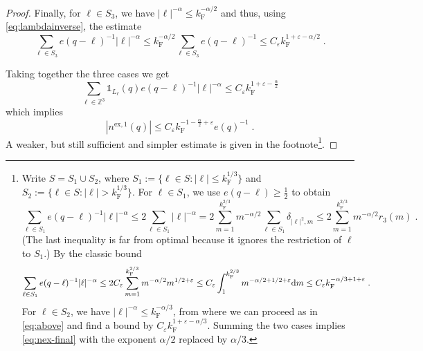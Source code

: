 \documentclass[12pt,a4paper]{article}
\numberwithin{equation}{section}
\newcommand{\1}{\mathbb{I}}
\newcommand{\di}{\textnormal{d}}
\newcommand{\ex}{\mathrm{ex}}
\newcommand{\F}{\mathrm{F}}
\newcommand{\kF}{k_\F}
\newcommand{\Zstar}{\mathbb{Z}^3} %
\newcommand{\Z}{\mathbb{Z}}
\theoremstyle{plain}
\theoremstyle{definition}
\theoremstyle{remark}
\theoremstyle{plain}
\theoremstyle{definition}
\theoremstyle{remark}
\begin{document}
\begin{proof}
\medskip

Finally, for $ \ell \in S_3 $, we have $ |\ell|^{-\alpha} \le \kF^{-\alpha/2} $ and thus, using \eqref{eq:lambdainverse}, the estimate
\begin{equation}\label{eq:above}
	\sum_{\ell \in S_3} e(q-\ell)^{-1} |\ell|^{-\alpha}
	\le \kF^{-\alpha/2} \sum_{\ell \in S_3} e(q-\ell)^{-1}
	\le C_\varepsilon \kF^{1 + \varepsilon - \alpha/2} \;.
\end{equation}

Taking together the three cases we get
\begin{equation}
	\sum_{\ell \in \Zstar} \mathds{1}_{L_\ell}(q) e(q-\ell)^{-1} |\ell|^{-\alpha}
	\le C_\varepsilon \kF^{1 + \varepsilon - \frac{\alpha}{2}}
\end{equation}
	which implies
\begin{equation}	\label{eq:nex-final}
	|n^{\ex,1}(q)|
	\leq C_\varepsilon \kF^{-1 - \frac{\alpha}{2} + \varepsilon} e(q)^{-1} \;.
\end{equation}
A weaker, but still sufficient and simpler estimate is given in the footnote\footnote{
Write  $ S = S_1 \cup S_2$, where $S_1  := \{ \ell \in S : |\ell| \le \kF^{1/3} \} $ and $S_2  := \{ \ell \in S : |\ell| > \kF^{1/3} \} $. For $ \ell \in S_1 $, we use $ e(q-\ell) \ge \frac{1}{2} $ to obtain
\begin{equation}
	\sum_{\ell \in S_1} e(q-\ell)^{-1} |\ell|^{-\alpha} \leq 2 \sum_{\ell \in S_1}  |\ell|^{-\alpha}
	= 2 \sum_{m = 1}^{\kF^{2/3}}  m^{-\alpha/2} \sum_{\ell \in S_1} \delta_{|\ell|^2, m}
	\leq 2 \sum_{m = 1}^{\kF^{2/3}}  m^{-\alpha/2} r_3(m) \;.
\end{equation}
(The last inequality is far from optimal because it ignores the restriction of $\ell$ to $S_1$.) By the classic bound
\begin{equation}
	\sum_{\ell \in S_1} e(q-\ell)^{-1} |\ell|^{-\alpha}
	\leq 2 C_\varepsilon \sum_{m = 1}^{\kF^{2/3}}  m^{-\alpha/2}  m^{1/2 + \varepsilon}
	\leq C_\varepsilon \int_1^{\kF^{2/3}} m^{-\alpha/2 + 1/2 + \varepsilon} \di m
	\leq C_\varepsilon \kF^{-\alpha/3 + 1 + \varepsilon} \;.
\end{equation}
%
For $ \ell \in S_2 $, we have $ |\ell|^{-\alpha} \le \kF^{-\alpha/3} $, from where we can proceed as in \eqref{eq:above} and find a bound by $ C_\varepsilon \kF^{1 + \varepsilon - \alpha/3}$. Summing the two cases implies \eqref{eq:nex-final} with the exponent $\alpha/2$ replaced by $\alpha/3$.
}.

\bigskip


\end{proof}
\end{document}
